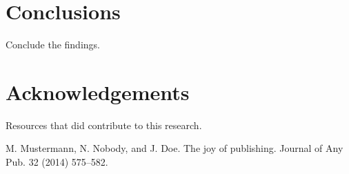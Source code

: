 \documentclass[fontsize=11pt,a4paper]{article}
\begin{document}
\section{Conclusions}\label{conclusions}

Conclude the findings. 

\section{Acknowledgements} 

Resources that did contribute to this research.

%
%

\begin{thebibliography}{}

M. Mustermann, N. Nobody, and J. Doe. The joy of publishing. Journal of Any Pub. 32 (2014) 575--582.

\end{thebibliography}
\end{document}
